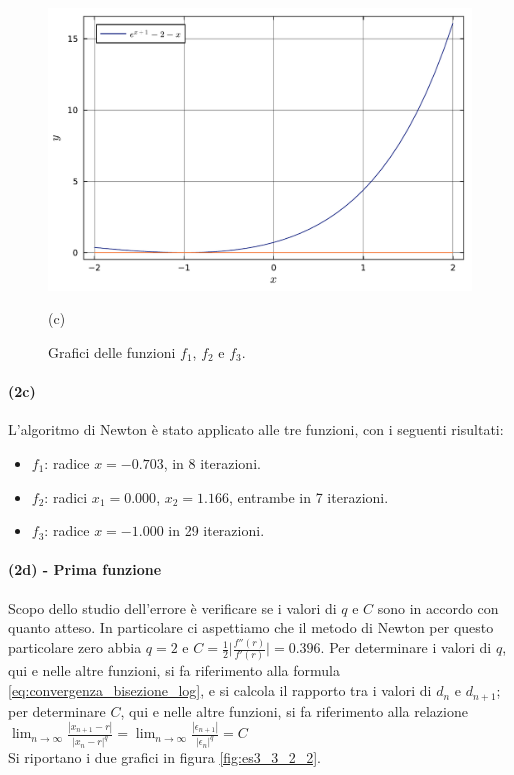 \documentclass[letterpaper, 12pt]{article}
\begin{document}
\begin{figure}[!ht]
    \vspace{0.5cm}

    \begin{minipage}[b]{0.47\textwidth}
        \includegraphics[width=\textwidth]{3323.pdf}
        \caption*{(c)}
    \end{minipage}
    \caption{Grafici delle funzioni $f_1$, $f_2$ e $f_3$.}
    \label{fig:es3_3_2_1}
\end{figure}

\paragraph{(2c) } L'algoritmo di Newton è stato applicato alle tre funzioni, con i seguenti risultati:
\begin{itemize}
    \item $f_1$: radice $x = -0.703$, in 8 iterazioni.
    \item $f_2$: radici $x_1 = 0.000$, $x_2 = 1.166$, entrambe in 7 iterazioni.
    \item $f_3$: radice $x = -1.000$ in 29 iterazioni.
\end{itemize}

\paragraph{(2d) - Prima funzione}
Scopo dello studio dell'errore è verificare se i valori di $q$ e $C$ sono in accordo con quanto atteso.
In particolare ci aspettiamo che il metodo di Newton per questo particolare zero abbia $q = 2$ e 
$C = {\frac{1}{2}}\bigg|{\frac{f''(r)}{f'(r)}}\bigg| = 0.396$. Per determinare i valori di $q$, qui e nelle altre funzioni,
si fa riferimento alla formula \ref{eq:convergenza_bisezione_log}, e si calcola il rapporto tra i valori di 
$d_n$ e $d_{n+1}$; per determinare $C$, qui e nelle altre funzioni, si fa riferimento alla relazione 
$\lim_{n\to\infty} {\frac{|x_{n+1}-r|}{|x_n-r|^q}}= \lim_{n\to\infty} {\frac{|\epsilon_{n+1}|}{|\epsilon_n|^q}}=C$ \\
Si riportano i due grafici in figura \ref{fig:es3_3_2_2}.
\end{document}
